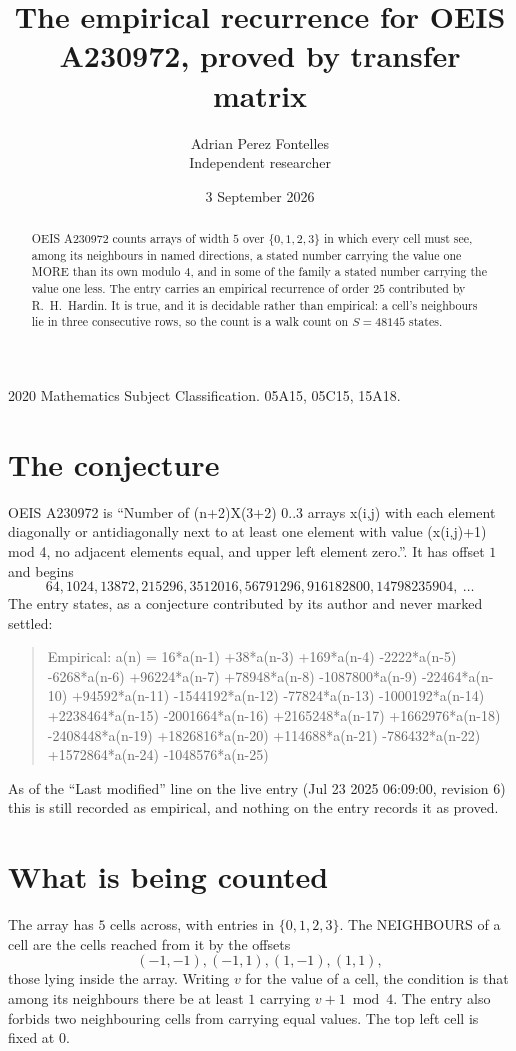\documentclass[11pt,a4paper]{article}
\title{The empirical recurrence for OEIS A230972, proved by transfer matrix}
\author{Adrian Perez Fontelles\\ \small Independent researcher}
\date{3 September 2026}
\theoremstyle{plain}
\theoremstyle{definition}
\begin{document}
\maketitle

\begin{abstract}
OEIS A230972 counts arrays of width $5$ over $\{0,1,2,3\}$ in which every cell must see, among its
neighbours in named directions, a stated number carrying the value one MORE than its own
modulo $4$, and in some of the family a stated number carrying the value one less. The entry
carries an empirical recurrence of order $25$ contributed by R.~H.~Hardin. It is true, and
it is decidable rather than empirical: a cell's neighbours lie in three consecutive rows, so
the count is a walk count on $S=48145$ states.
\end{abstract}

\noindent\small 2020 Mathematics Subject Classification. 05A15, 05C15, 15A18.\normalsize

\section{The conjecture}

OEIS A230972 is ``Number of (n+2)X(3+2) 0..3 arrays x(i,j) with each element diagonally or antidiagonally next to at least one element with value (x(i,j)+1) mod 4, no adjacent elements equal, and upper left element zero.''. It has offset $1$ and begins
\[
64, 1024, 13872, 215296, 3512016, 56791296, 916182800, 14798235904,\ \dots
\]
The entry states, as a conjecture contributed by its author and never marked settled:
\begin{quote}
Empirical: a(n) = 16*a(n-1) +38*a(n-3) +169*a(n-4) -2222*a(n-5) -6268*a(n-6) +96224*a(n-7) +78948*a(n-8) -1087800*a(n-9) -22464*a(n-10) +94592*a(n-11) -1544192*a(n-12) -77824*a(n-13) -1000192*a(n-14) +2238464*a(n-15) -2001664*a(n-16) +2165248*a(n-17) +1662976*a(n-18) -2408448*a(n-19) +1826816*a(n-20) +114688*a(n-21) -786432*a(n-22) +1572864*a(n-24) -1048576*a(n-25)
\end{quote}
As of the ``Last modified'' line on the live entry (Jul 23 2025 06:09:00, revision 6) this is still
recorded as empirical, and nothing on the entry records it as proved.

\section{What is being counted}

The array has $5$ cells across, with entries in $\{0,1,2,3\}$. The NEIGHBOURS of a cell are the
cells reached from it by the offsets
\[
(-1,-1), (-1,1), (1,-1), (1,1),
\]
those lying inside the array. Writing $v$ for the value of a cell, the condition is that among
its neighbours there be at least $1$ carrying $v+1 \bmod 4$. The entry also forbids two neighbouring cells from carrying equal values. The top left
cell is fixed at $0$.
\end{document}
